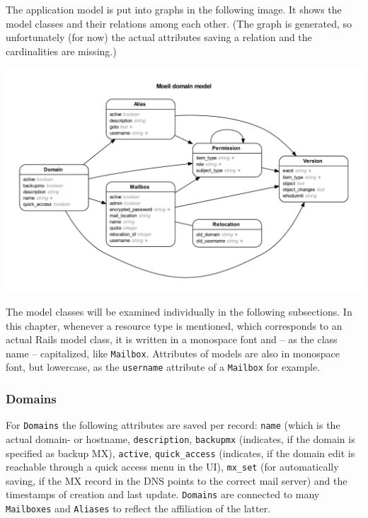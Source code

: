 \documentclass[12pt,a4paper]{scrartcl}
\begin{document}
			The application model is put into graphs in the following image. It
			shows the model classes and their relations among each other. (The
			graph is generated, so unfortunately (for now) the actual
			attributes saving a relation and the cardinalities are missing.)

			\includegraphics[width=\textwidth]{images/erd.pdf}

			\noindent
			The model classes will be examined individually in the following
			subsections. In this chapter, whenever a resource type is
			mentioned, which corresponds to an actual \ac{Rails} model class,
			it is written in a monospace font and -- as the class name --
			capitalized, like \texttt{Mailbox}. Attributes of models are also
			in monospace font, but lowercase, as the \texttt{username}
			attribute of a \texttt{Mailbox} for example.

			\subsubsection{Domains}
				For \texttt{Domains} the following attributes are saved per
				record: \texttt{name} (which is the actual domain- or hostname,
				\texttt{description}, \texttt{backupmx} (indicates, if the
				domain is specified as backup MX), \texttt{active},
				\texttt{quick\_access} (indicates, if the domain edit is
				reachable through a quick access menu in the \ac{UI}),
				\texttt{mx\_set} (for automatically saving, if the MX record in
				the DNS points to the correct mail server) and the timestamps
				of creation and last update. \texttt{Domains} are connected to
				many \texttt{Mailboxes} and \texttt{Aliases} to reflect the
				affiliation of the latter.
\end{document}
